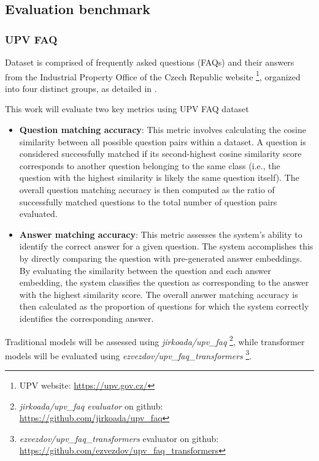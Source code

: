 \subsection{Evaluation  benchmark}

\subsubsection{UPV FAQ}

Dataset is comprised of frequently asked questions (FAQs) and their answers from the Industrial Property Office of the Czech Republic website \footnote{UPV website: \url{https://upv.gov.cz/}}, organized into four distinct groups, as detailed in .

This work will evaluate two key metrics using UPV FAQ dataset
\begin{itemize}
  \item \textbf{Question matching accuracy}:
    This metric involves calculating the cosine similarity between all possible question pairs within a dataset.
    A question is considered successfully matched if its second-highest cosine similarity score corresponds to another question belonging to the same class (i.e., the question with the highest similarity is likely the same question itself). 
    The overall question matching accuracy is then computed as the ratio of successfully matched questions to the total number of question pairs evaluated.  
  \item \textbf{Answer matching accuracy}:
    This metric assesses the system's ability to identify the correct answer for a given question.
    The system accomplishes this by directly comparing the question with pre-generated answer embeddings.
    By evaluating the similarity between the question and each answer embedding, the system classifies the question as corresponding to the answer with the highest similarity score.
    The overall answer matching accuracy is then calculated as the proportion of questions for which the system correctly identifies the corresponding answer.  
\end{itemize}



Traditional models will be assessed using \textit{jirkoada/upv\_faq} \footnote{\textit{jirkoada/upv\_faq evaluator} on github: \url{https://github.com/jirkoada/upv_faq}}, while transformer models will be evaluated using \textit{ezvezdov/upv\_faq\_transformers} \footnote{\textit{ezvezdov/upv\_faq\_transformers} evaluator on github: \url{https://github.com/ezvezdov/upv_faq_transformers}}.


